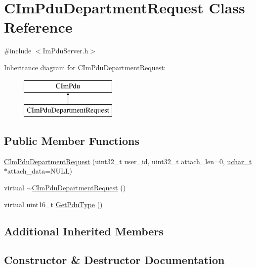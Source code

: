 \hypertarget{class_c_im_pdu_department_request}{}\section{C\+Im\+Pdu\+Department\+Request Class Reference}
\label{class_c_im_pdu_department_request}


{\ttfamily \#include $<$Im\+Pdu\+Server.\+h$>$}

Inheritance diagram for C\+Im\+Pdu\+Department\+Request\+:\begin{figure}[H]
\begin{center}
\leavevmode
\includegraphics[height=2.000000cm]{class_c_im_pdu_department_request}
\end{center}
\end{figure}
\subsection*{Public Member Functions}
\begin{DoxyCompactItemize}
\item 
\hyperlink{class_c_im_pdu_department_request_a58722502eb22f31534a76b0ccca2bc26}{C\+Im\+Pdu\+Department\+Request} (uint32\+\_\+t user\+\_\+id, uint32\+\_\+t attach\+\_\+len=0, \hyperlink{base_2ostype_8h_a124ea0f8f4a23a0a286b5582137f0b8d}{uchar\+\_\+t} $\ast$attach\+\_\+data=N\+U\+L\+L)
\item 
virtual \hyperlink{class_c_im_pdu_department_request_a59017c0c8d859da803e56f6b82cc857e}{$\sim$\+C\+Im\+Pdu\+Department\+Request} ()
\item 
virtual uint16\+\_\+t \hyperlink{class_c_im_pdu_department_request_a0f126847df4feffe208a778b0904e96b}{Get\+Pdu\+Type} ()
\end{DoxyCompactItemize}
\subsection*{Additional Inherited Members}


\subsection{Constructor \& Destructor Documentation}
\hypertarget{class_c_im_pdu_department_request_a58722502eb22f31534a76b0ccca2bc26}{}
